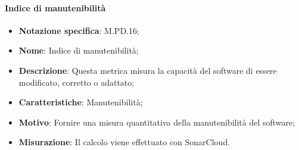 \paragraph*{Indice di manutenibilità}
\begin{itemize}
    \item \textbf{Notazione specifica}: M.PD.16;
    \item \textbf{Nome}: Indice di manutenibilità;
    \item \textbf{Descrizione}: Questa metrica misura la capacità del software di essere modificato, corretto o adattato;
    \item \textbf{Caratteristiche}: Manutenibilità;
    \item \textbf{Motivo}: Fornire una misura quantitativa della manutenibilità del software;
    \item \textbf{Misurazione}: Il calcolo viene effettuato con SonarCloud.
\end{itemize}
